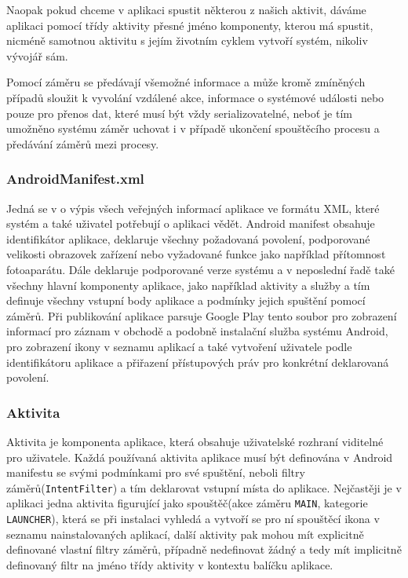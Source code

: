 \documentclass[czech,master,public,dept460,male,java,cpdeclaration]{diploma}
\begin{document}
Naopak pokud chceme v aplikaci spustit některou z našich aktivit, dáváme aplikaci pomocí třídy
aktivity přesné jméno komponenty, kterou má spustit, nicméně samotnou aktivitu s jejím životním
cyklem vytvoří systém, nikoliv vývojář sám.

Pomocí záměru se předávají všemožné informace a může kromě zmíněných případů sloužit k vyvolání
vzdálené akce, informace o systémové události nebo pouze pro přenos dat, které musí být vždy
serializovatelné, neboť je tím umožněno systému záměr uchovat i v případě ukončení spouštěcího
procesu a předávání záměrů mezi procesy.

\subsubsection{AndroidManifest.xml}
Jedná se v o výpis všech veřejných informací aplikace ve formátu XML, které systém
a také uživatel potřebují o aplikaci vědět. Android manifest obsahuje identifikátor aplikace, deklaruje všechny
požadovaná povolení, podporované velikosti obrazovek zařízení nebo vyžadované funkce jako například přítomnost
fotoaparátu. Dále deklaruje podporované verze systému a v neposlední řadě také všechny hlavní komponenty
aplikace, jako například aktivity a služby a tím definuje všechny vstupní body aplikace a podmínky
jejich spuštění pomocí záměrů. Při publikování aplikace
parsuje Google Play tento soubor pro zobrazení informací pro záznam v obchodě a podobně instalační služba
systému Android, pro zobrazení ikony v seznamu aplikací a také vytvoření uživatele podle identifikátoru
aplikace a přiřazení přístupových práv pro konkrétní deklarovaná povolení.

\subsubsection{Aktivita}
Aktivita je komponenta aplikace, která obsahuje uživatelské rozhraní viditelné pro uživatele. Každá
 používaná aktivita aplikace musí být definována v Android manifestu se svými podmínkami pro své
 spuštění, neboli filtry záměrů(\texttt{IntentFilter}) a tím deklarovat vstupní místa do aplikace.
 Nejčastěji je v aplikaci jedna aktivita figurující jako spouštěč(akce záměru \texttt{MAIN},
 kategorie \texttt{LAUNCHER}), která se při
  instalaci vyhledá a vytvoří se pro ní spouštěcí ikona v seznamu nainstalovaných aplikací, další
  aktivity pak mohou mít explicitně definované vlastní filtry záměrů, případně nedefinovat žádný
  a tedy mít implicitně definovaný filtr na jméno třídy aktivity v kontextu balíčku aplikace.
\end{document}
